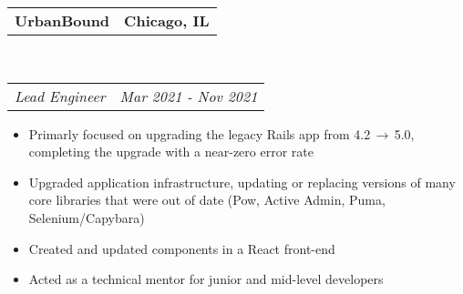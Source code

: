 \documentclass[10pt,letterpaper]{article}
\makeatletter
\newcommand{\headerrow}[2]
{\begin{tabular*}{\linewidth}{l@{\extracolsep{\fill}}r}
  #1 &
  #2 \\
\end{tabular*}}
\newenvironment{indentsection}[1]%
{\begin{list}{}%
  {\setlength{\leftmargin}{#1}}%
  \item[]%
}
{\end{list}}
\makeatother
\begin{document}
\begin{indentsection}{\parindent}
  \headerrow
    {\textbf{UrbanBound} }
    {\textbf{Chicago, IL}}
  \\
  \headerrow
    {\emph{Lead Engineer}}
    {\emph{Mar 2021 - Nov 2021}}

  \begin{itemize}
  \renewcommand{\labelitemi}{$-$}
  \vspace{-0.1in}
    \item Primarly focused on upgrading the legacy Rails app from 4.2$\,\to\,$5.0, completing the upgrade with a near-zero error rate
    \item Upgraded application infrastructure, updating or replacing versions of many core libraries that were out of date (Pow, Active Admin, Puma, Selenium/Capybara)
    \item Created and updated components in a React front-end
    \item Acted as a technical mentor for junior and mid-level developers
  \end{itemize}
\end{indentsection}
\end{document}
